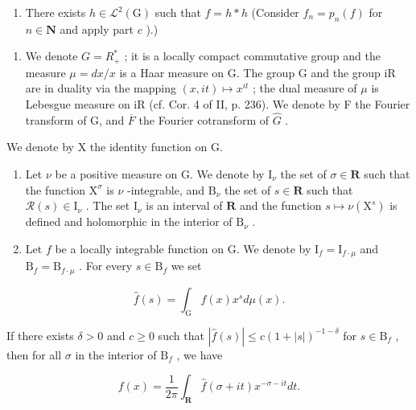 \begin{enumerate}
\def\labelenumi{\alph{enumi})}
\setcounter{enumi}{5}
\tightlist
\item
  There exists \(h \in \mathcal{L}^2(\mathrm{G})\) such that \(f = h * h\) (Consider \(f_n = p_n(f)\) for \(n \in \mathbf{N}\) and apply part \(c\) ).)
\end{enumerate}

\begin{enumerate}
\def\labelenumi{\arabic{enumi})}
\setcounter{enumi}{22}
\tightlist
\item
  We denote \(G = R_{+}^{*}\) ; it is a locally compact commutative group and the measure \(\mu = dx/x\) is a Haar measure on G. The group G and the group iR are in duality via the mapping \((x, it) \mapsto x^{it}\) ; the dual measure of \(\mu\) is Lebesgue measure on iR (cf. Cor. 4 of II, p. 236). We denote by F the Fourier transform of G, and \(\overline{F}\) the Fourier cotransform of \(\widehat{G}\) .
\end{enumerate}

We denote by X the identity function on G.

\begin{enumerate}
\def\labelenumi{\alph{enumi})}
\item
  Let \(\nu\) be a positive measure on G. We denote by \(\mathrm{I}_{\nu}\) the set of \(\sigma \in \mathbf{R}\) such that the function \(\mathrm{X}^{\sigma}\) is \(\nu\) -integrable, and \(\mathrm{B}_{\nu}\) the set of \(s \in \mathbf{R}\) such that \(\mathcal{R}(s) \in \mathrm{I}_{\nu}\) . The set \(\mathrm{I}_{\nu}\) is an interval of \(\mathbf{R}\) and the function \(s \mapsto \nu(\mathrm{X}^s)\) is defined and holomorphic in the interior of \(\mathrm{B}_{\nu}\) .
\item
  Let \(f\) be a locally integrable function on G. We denote by \(\mathrm{I}_{f} = \mathrm{I}_{f\cdot \mu}\) and \(\mathrm{B}_f = \mathrm{B}_{f\cdot \mu}\) . For every \(s \in \mathrm{B}_f\) we set
\end{enumerate}

\[
\widehat {f} (s) = \int_ {\mathrm{G}} f (x) x ^ {s} d \mu (x).
\]

If there exists \(\delta > 0\) and \(c \geqslant 0\) such that \(|\widehat{f}(s)| \leqslant c(1 + |s|)^{-1 - \delta}\) for \(s \in \mathrm{B}_f\) , then for all \(\sigma\) in the interior of \(\mathrm{B}_f\) , we have

\[
f (x) = \frac {1}{2 \pi} \int_ {\mathbf {R}} \widehat {f} (\sigma + i t) x ^ {- \sigma - i t} d t.
\]

